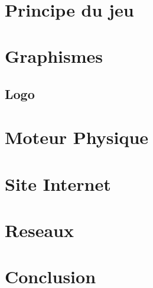 \documentclass [11pt]{report}
\begin{document}
	\newpage\

\chapter{Principe du jeu}

\chapter {Graphismes}
	\section {Logo}
\chapter {Moteur Physique}
\chapter {Site Internet}
\chapter {Reseaux}
\chapter {Conclusion}
\end{document}
